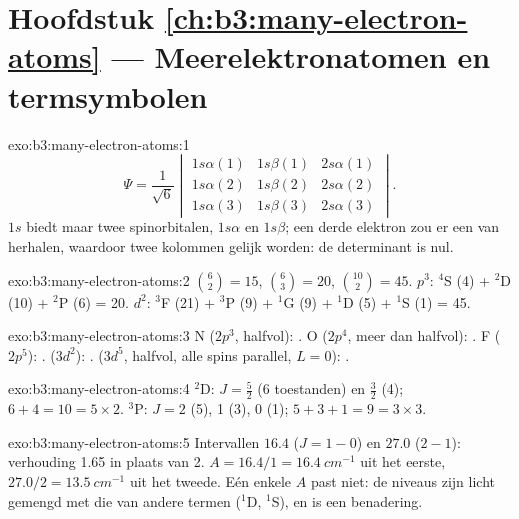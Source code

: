 \section*{Hoofdstuk \ref{ch:b3:many-electron-atoms} --- Meerelektronatomen en termsymbolen}

\begin{solution}{exo:b3:many-electron-atoms:1}
\[
\Psi = \frac{1}{\sqrt6}\begin{vmatrix}1s\alpha(1) & 1s\beta(1) & 2s\alpha(1)\\
1s\alpha(2) & 1s\beta(2) & 2s\alpha(2)\\ 1s\alpha(3) & 1s\beta(3) & 2s\alpha(3)
\end{vmatrix}.
\]
$1s$ biedt maar twee spinorbitalen, $1s\alpha$ en $1s\beta$; een derde
elektron zou er een van herhalen, waardoor twee kolommen gelijk worden: de
determinant is nul.
\end{solution}

\begin{solution}{exo:b3:many-electron-atoms:2}
$\binom62 = 15$, $\binom63 = 20$, $\binom{10}{2} = 45$. $p^3$: ${}^4$S (4) +
${}^2$D (10) + ${}^2$P (6) = 20. $d^2$: ${}^3$F (21) + ${}^3$P (9) + ${}^1$G (9) +
${}^1$D (5) + ${}^1$S (1) = 45.
\end{solution}

\begin{solution}{exo:b3:many-electron-atoms:3}
N ($2p^3$, halfvol): . O ($2p^4$, meer dan halfvol):
. F ($2p^5$): .  ($3d^2$):
.  ($3d^5$, halfvol, alle spins parallel, $L = 0$):
.
\end{solution}

\begin{solution}{exo:b3:many-electron-atoms:4}
${}^2$D: $J = \frac52$ (6 toestanden) en $\frac32$ (4); $6 + 4 = 10 = 5 \times 2$.
${}^3$P: $J = 2$ (5), 1 (3), 0 (1); $5 + 3 + 1 = 9 = 3 \times 3$.
\end{solution}

\begin{solution}{exo:b3:many-electron-atoms:5}
Intervallen $16.4$ ($J = 1 - 0$) en $27.0$ ($2 - 1$): verhouding 1.65 in plaats van 2.
$A = 16.4/1 = \qty{16.4}{cm^{-1}}$ uit het eerste, $27.0/2 = \qty{13.5}{cm^{-1}}$
uit het tweede. Eén enkele $A$ past niet: de niveaus zijn licht gemengd met
die van andere termen (${}^1$D, ${}^1$S), en  is een
benadering.
\end{solution}

